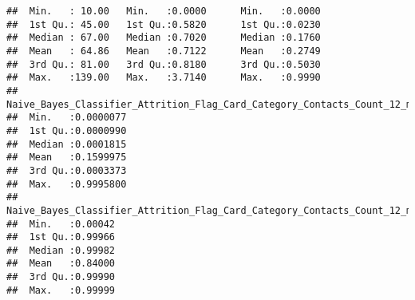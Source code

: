 \documentclass[]{article}
\begin{document}
\begin{verbatim}
##  Min.   : 10.00   Min.   :0.0000      Min.   :0.0000       
##  1st Qu.: 45.00   1st Qu.:0.5820      1st Qu.:0.0230       
##  Median : 67.00   Median :0.7020      Median :0.1760       
##  Mean   : 64.86   Mean   :0.7122      Mean   :0.2749       
##  3rd Qu.: 81.00   3rd Qu.:0.8180      3rd Qu.:0.5030       
##  Max.   :139.00   Max.   :3.7140      Max.   :0.9990       
##  Naive_Bayes_Classifier_Attrition_Flag_Card_Category_Contacts_Count_12_mon_Dependent_count_Education_Level_Months_Inactive_12_mon_1
##  Min.   :0.0000077                                                                                                                 
##  1st Qu.:0.0000990                                                                                                                 
##  Median :0.0001815                                                                                                                 
##  Mean   :0.1599975                                                                                                                 
##  3rd Qu.:0.0003373                                                                                                                 
##  Max.   :0.9995800                                                                                                                 
##  Naive_Bayes_Classifier_Attrition_Flag_Card_Category_Contacts_Count_12_mon_Dependent_count_Education_Level_Months_Inactive_12_mon_2
##  Min.   :0.00042                                                                                                                   
##  1st Qu.:0.99966                                                                                                                   
##  Median :0.99982                                                                                                                   
##  Mean   :0.84000                                                                                                                   
##  3rd Qu.:0.99990                                                                                                                   
##  Max.   :0.99999
\end{verbatim}
\end{document}
